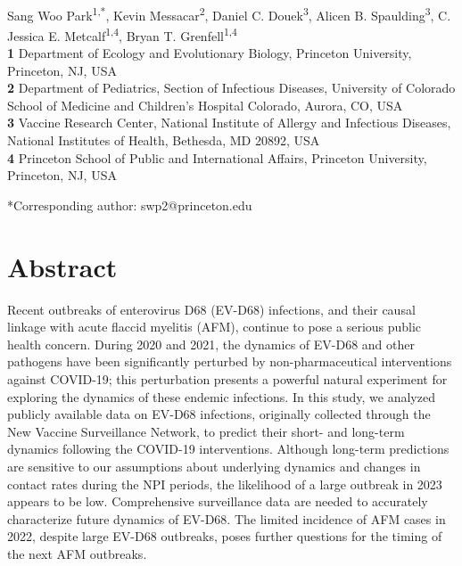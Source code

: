 \documentclass[12pt]{article}
\date{\today}
\begin{document}
\begin{flushleft}{
	\Large
	\textbf{}
}
\newline
\\
Sang Woo Park\textsuperscript{1,*},
Kevin Messacar\textsuperscript{2},
Daniel C. Douek\textsuperscript{3},
Alicen B. Spaulding\textsuperscript{3},
C. Jessica E. Metcalf\textsuperscript{1,4},
Bryan T. Grenfell\textsuperscript{1,4}
\\
\bigskip
\textbf{1} Department of Ecology and Evolutionary Biology, Princeton University, Princeton, NJ, USA
\\
\textbf{2} Department of Pediatrics, Section of Infectious Diseases, University of Colorado School of Medicine and Children's Hospital Colorado, Aurora, CO, USA
\\
\textbf{3} Vaccine Research Center, National Institute of Allergy and Infectious Diseases, National Institutes of Health, Bethesda, MD 20892, USA\\
\textbf{4} Princeton School of Public and International Affairs, Princeton University, Princeton, NJ, USA
\\
\bigskip

*Corresponding author: swp2@princeton.edu
\bigskip
\end{flushleft}

\section*{Abstract}

Recent outbreaks of enterovirus D68 (EV-D68) infections, and their causal linkage with acute flaccid myelitis (AFM), continue to pose a serious public health concern.
During 2020 and 2021, the dynamics of EV-D68 and other pathogens have been significantly perturbed by non-pharmaceutical interventions against COVID-19; this perturbation presents a powerful natural experiment for exploring the dynamics of these endemic infections.
In this study, we analyzed publicly available data on EV-D68 infections, originally collected through the New Vaccine Surveillance Network, to predict their short- and long-term dynamics following the COVID-19 interventions.
Although long-term predictions are sensitive to our assumptions about underlying dynamics and changes in contact rates during the NPI periods, the likelihood of a large outbreak in 2023 appears to be low.
Comprehensive surveillance data are needed to accurately characterize future dynamics of EV-D68.
The limited incidence of AFM cases in 2022, despite large EV-D68 outbreaks, poses further questions for the timing of the next AFM outbreaks.
\end{document}
